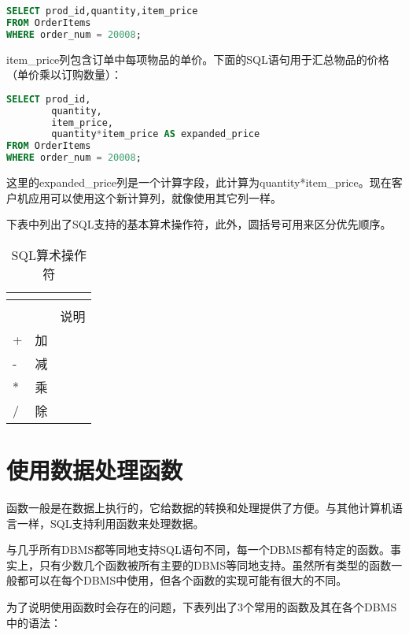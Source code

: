 \begin{lstlisting}[language=SQL]
SELECT prod_id,quantity,item_price
FROM OrderItems
WHERE order_num = 20008;
\end{lstlisting}

item\_price列包含订单中每项物品的单价。下面的SQL语句用于汇总物品的价格（单价乘以订购数量）：

\begin{lstlisting}[language=SQL]
SELECT prod_id,
		quantity,
		item_price,
		quantity*item_price AS expanded_price
FROM OrderItems
WHERE order_num = 20008;
\end{lstlisting}

这里的expanded\_price列是一个计算字段，此计算为quantity*item\_price。现在客户机应用可以使用这个新计算列，就像使用其它列一样。

下表中列出了SQL支持的基本算术操作符，此外，圆括号可用来区分优先顺序。

\begin{longtable}{|m{180pt}|m{180pt}|}
\multicolumn{2}{r}{}
\tabularnewline\hline
\endhead

\caption{SQL算术操作符}\\
\endfirsthead

\multicolumn{2}{r}{}
\endfoot

\endlastfoot
\hline
操作符	&说明\\
\hline
+		&加\\
\hline
- 		&减\\
\hline
* 		&乘\\
\hline
/ 		&除\\
\hline
\end{longtable}


\section{使用数据处理函数}

函数一般是在数据上执行的，它给数据的转换和处理提供了方便。与其他计算机语言一样，SQL支持利用函数来处理数据。

与几乎所有DBMS都等同地支持SQL语句不同，每一个DBMS都有特定的函数。事实上，只有少数几个函数被所有主要的DBMS等同地支持。虽然所有类型的函数一般都可以在每个DBMS中使用，但各个函数的实现可能有很大的不同。

为了说明使用函数时会存在的问题，下表列出了3个常用的函数及其在各个DBMS中的语法：

